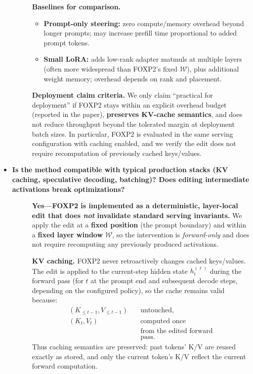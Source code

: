 \begin{itemize}[leftmargin=1.5em]
\begin{description}
\vspace{4pt}
\textbf{Baselines for comparison.}
\begin{itemize}[leftmargin=*,itemsep=2pt]
\item \textbf{Prompt-only steering:} zero compute/memory overhead beyond longer prompts; may increase prefill time proportional to added prompt tokens.
\item \textbf{Small LoRA:} adds low-rank adapter matmuls at multiple layers (often more widespread than FOXP2’s fixed $\mathcal{W}$), plus additional weight memory; overhead depends on rank and placement.
\end{itemize}

\vspace{4pt}
\textbf{Deployment claim criteria.}
We only claim “practical for deployment” if FOXP2 stays within an explicit overhead budget (reported in the paper), \textbf{preserves KV-cache semantics}, and does not reduce throughput beyond the tolerated margin at deployment batch sizes. In particular, FOXP2 is evaluated in the same serving configuration with caching enabled, and we verify the edit does not require recomputation of previously cached keys/values.
\end{description}


\item[\ding{93}] \textbf{Is the method compatible with typical production stacks (KV caching, speculative decoding, batching)? Does editing intermediate activations break optimizations?}
\begin{description}
\item[] \textbf{Yes—FOXP2 is implemented as a deterministic, layer-local edit that does \emph{not} invalidate standard serving invariants.}
We apply the edit at a \textbf{fixed position} (the prompt boundary) and within a \textbf{fixed layer window} $\mathcal{W}$, so the intervention is \emph{forward-only} and does not require recomputing any previously produced activations.

\vspace{4pt}
\textbf{KV caching.} FOXP2 never retroactively changes cached keys/values. The edit is applied to the current-step hidden state $h^{(\ell)}_t$ during the forward pass (for $t$ at the prompt end and subsequent decode steps, depending on the configured policy), so the cache remains valid because:
\[
\begin{aligned}
(K_{\le t-1},V_{\le t-1}) &\quad \text{untouched},\\
(K_t,V_t) &\quad \text{computed once}\\
&\quad \text{from the edited forward} \\
&\quad \text{pass}.
\end{aligned}
\]
Thus caching semantics are preserved: past tokens’ K/V are reused exactly as stored, and only the current token’s K/V reflect the current forward computation.


\end{description}
\end{itemize}
